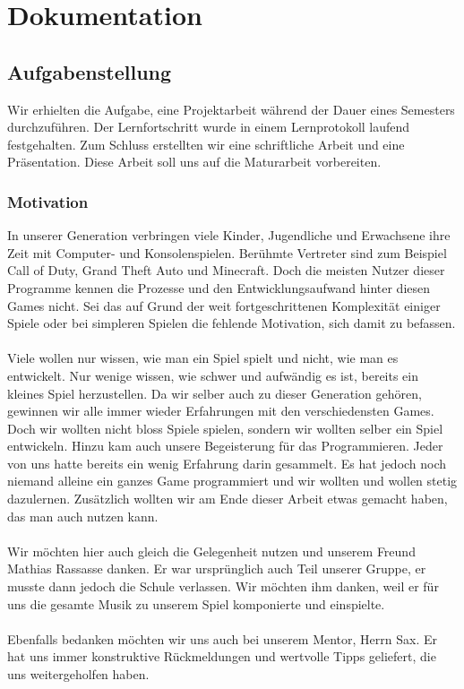 \documentclass[11pt,a4paper]{scrbook}
\begin{document}
\thispagestyle{empty}
\clearscrheadfoot
\rofoot[\pagemark]{\pagemark}
\lefoot[\pagemark]{\pagemark}
\thispagestyle{empty}
\tableofcontents

\clearpage
{}


\part{Dokumentation}
\chapter{Aufgabenstellung}
Wir erhielten die Aufgabe, eine Projektarbeit während der Dauer eines Semesters durchzuführen. Der Lernfortschritt wurde in einem Lernprotokoll laufend festgehalten.
Zum Schluss erstellten wir eine schriftliche Arbeit und eine Präsentation. Diese Arbeit soll uns auf die Maturarbeit vorbereiten.

\section{Motivation}
In unserer Generation verbringen viele Kinder, Jugendliche und Erwachsene ihre Zeit mit Computer- und Konsolenspielen.
Berühmte Vertreter sind zum Beispiel Call of Duty, Grand Theft Auto und Minecraft.
Doch die meisten Nutzer dieser Programme kennen die Prozesse und den Entwicklungsaufwand hinter diesen Games nicht.
Sei das auf Grund der weit fortgeschrittenen Komplexität einiger Spiele
oder bei simpleren Spielen die fehlende Motivation, sich damit zu befassen.\\
\\
Viele wollen nur wissen, wie man ein Spiel spielt und nicht, wie man es entwickelt. Nur wenige wissen, wie schwer und aufwändig es ist, bereits ein kleines Spiel herzustellen.
Da wir selber auch zu dieser Generation gehören,
gewinnen wir alle immer wieder Erfahrungen mit den verschiedensten Games.
Doch wir wollten nicht bloss Spiele spielen,
sondern wir wollten selber ein Spiel entwickeln.
Hinzu kam auch unsere Begeisterung für das Programmieren.
Jeder von uns hatte bereits ein wenig Erfahrung darin gesammelt.
Es hat jedoch noch niemand alleine
ein ganzes Game programmiert und
wir wollten und wollen stetig dazulernen.
Zusätzlich wollten wir am Ende dieser Arbeit etwas gemacht haben, das man auch nutzen kann.\\
\\
Wir möchten hier auch gleich die Gelegenheit nutzen und unserem Freund Mathias Rassasse danken. Er war ursprünglich auch Teil unserer Gruppe, er musste dann jedoch die Schule verlassen. Wir möchten ihm danken, weil er für uns die gesamte Musik zu unserem Spiel komponierte und einspielte.\\
\\
Ebenfalls bedanken möchten wir uns auch bei unserem Mentor, Herrn Sax. Er hat uns immer konstruktive Rückmeldungen und wertvolle Tipps geliefert, die uns weitergeholfen haben.
\end{document}
